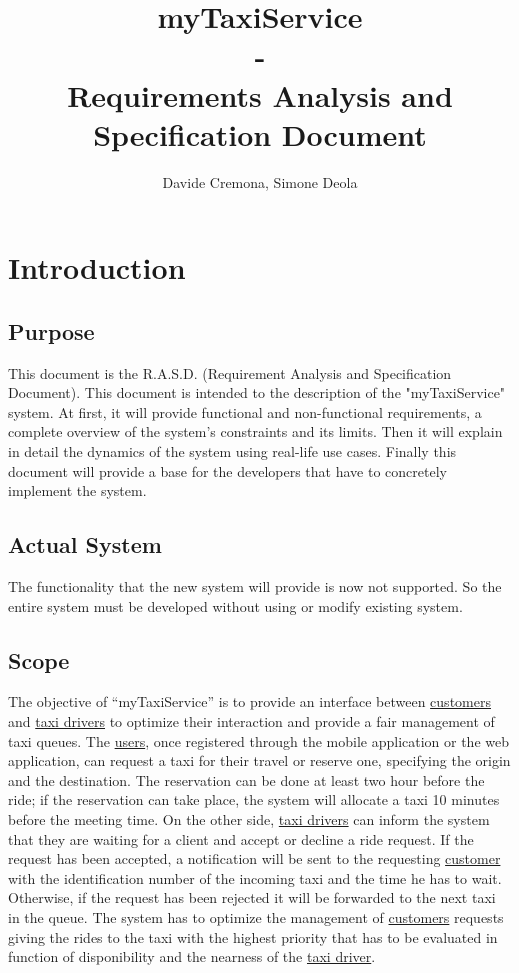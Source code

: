 \documentclass{report}
\begin{document}
\title{myTaxiService \\ -  \\ Requirements Analysis and Specification Document}
\author{Davide Cremona, Simone Deola}
\maketitle

\tableofcontents

\chapter{Introduction}
\section{Purpose}
This document is the R.A.S.D. (Requirement Analysis and Specification Document).
This document is intended to the description of the "myTaxiService" system. 
At first, it will provide functional and non-functional requirements, a complete overview of the system's constraints and its limits. Then it will explain in detail the dynamics of the system using real-life use cases.
Finally this document will provide a base for the developers that have to concretely implement the system.

\section{Actual System}
The functionality that the new system will provide is now not supported. 
So the entire system must be developed without using or modify existing system.

\section{Scope}
The objective of “myTaxiService” is to provide an interface between \hyperref[sec:customer]{customers} and \hyperref[sec:tdriver]{taxi drivers} to optimize their interaction and provide a fair management of taxi queues. The \hyperref[sec:normaluser]{users}, once registered through the mobile application or the web application, can request a taxi for their travel or reserve one, specifying the origin and the destination. The reservation can be done at least two hour before the ride; if the reservation can take place, the system will allocate a taxi 10 minutes before the meeting time.
On the other side, \hyperref[sec:tdriver]{taxi drivers} can inform the system that they are waiting for a client and accept or decline a ride request. If the request has been accepted, a notification will be sent to the requesting \hyperref[sec:customer]{customer} with the identification number of the incoming taxi and the time he has to wait. Otherwise, if the request has been rejected it will be forwarded to the next taxi in the queue.
The system has to optimize the management of \hyperref[sec:customer]{customers} requests giving the rides to the taxi with the highest priority that has to be evaluated in function of disponibility and the nearness of the \hyperref[sec:tdriver]{taxi driver}.
\end{document}
